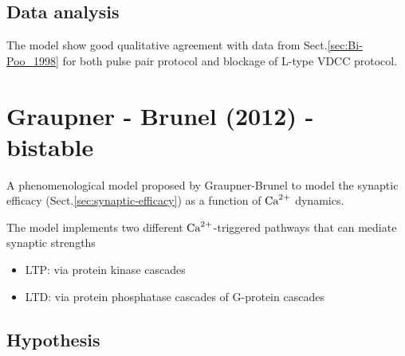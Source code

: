 \subsection{Data analysis}


The model show good qualitative agreement with data from
Sect.\ref{sec:Bi-Poo_1998} for both pulse pair protocol and blockage of L-type
VDCC protocol.


\section{Graupner - Brunel (2012) - bistable}
\label{sec:Graupner-Brunel-2012}

A phenomenological model proposed by Graupner-Brunel to model the synaptic
efficacy (Sect.\ref{sec:synaptic-efficacy}) as a function of ${\text{Ca}^{2+}}$ dynamics.

The model implements two different ${\text{Ca}^{2+}}$-triggered pathways that can mediate
synaptic strengths
\begin{itemize}
  \item LTP: via protein kinase cascades
  \item LTD: via protein phosphatase cascades of G-protein cascades
\end{itemize}

\subsection{Hypothesis}

